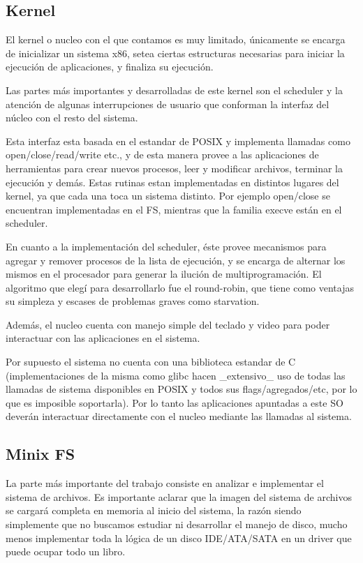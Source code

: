 \subsection{Kernel}

El kernel o nucleo con el que contamos es muy limitado, únicamente se encarga de
inicializar un sistema x86, setea ciertas estructuras necesarias para iniciar la
ejecución de aplicaciones, y finaliza su ejecución.

Las partes más importantes y desarrolladas de este kernel son el scheduler y la
atención de algunas interrupciones de usuario que conforman la interfaz del
núcleo con el resto del sistema.

Esta interfaz esta basada en el estandar de POSIX y implementa llamadas como
open/close/read/write etc., y de esta manera provee a las aplicaciones de
herramientas para crear nuevos procesos, leer y modificar archivos, terminar
la ejecución y demás. Estas rutinas estan implementadas en distintos lugares
del kernel, ya que cada una toca un sistema distinto. Por ejemplo open/close
se encuentran implementadas en el FS, mientras que la familia execve están en
el scheduler.

En cuanto a la implementación del scheduler, éste provee mecanismos para agregar
y remover procesos de la lista de ejecución, y se encarga de alternar los mismos
en el procesador para generar la ilución de multiprogramación. El algoritmo que
elegí para desarrollarlo fue el round-robin, que tiene como ventajas su simpleza
y escases de problemas graves como starvation.

Además, el nucleo cuenta con manejo simple del teclado y video para poder
interactuar con las aplicaciones en el sistema.

Por supuesto el sistema no cuenta con una biblioteca estandar de C
(implementaciones de la misma como glibc hacen \_extensivo\_ uso de todas las
llamadas de sistema disponibles en POSIX y todos sus flags/agregados/etc, por lo
que es imposible soportarla). Por lo tanto las aplicaciones apuntadas a este SO
deverán interactuar directamente con el nucleo mediante las llamadas al sistema.

\subsection{Minix FS}

La parte más importante del trabajo consiste en analizar e implementar el
sistema de archivos. Es importante aclarar que la imagen del sistema de archivos
se cargará completa en memoria al inicio del sistema, la razón siendo
simplemente que no buscamos estudiar ni desarrollar el manejo de disco, mucho
menos implementar toda la lógica de un disco IDE/ATA/SATA en un driver que puede
ocupar todo un libro.


